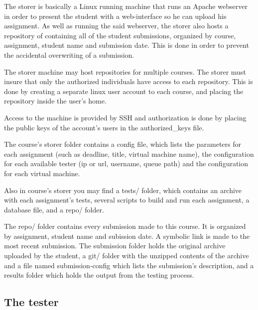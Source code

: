 The storer is basically a Linux running machine that runs an Apache webserver
in order to present the student with a web-interface so he can upload his
assignment. As well as running the said webserver, the storer also hosts a 
repository of containing all of the student submissions, organized by course,
assignment, student name and submission date. This is done in order to prevent
the accidental overwriting of a submission.

\begin{center}
\end{center}

The storer machine may host repositories for multiple courses. The storer
must insure that only the authorized individuals have access to each repository.
This is done by creating a separate linux user account to each course, and placing
the repository inside the user's home. 

Access to the machine is provided by SSH and authorization is done by placing
the public keys of the account's users in the authorized_keys file.

The course's storer folder contains a config file, which lists the parameters
for each assignment (such as deadline, title, virtual machine name), the 
configuration for each available tester (ip or url, username, queue path)
and the configuration for each virtual machine.

Also in course's storer you may find a tests/ folder, which contains an archive
with each assignment's tests, several scripts to build and run each assignment,
a database file, and a repo/ folder.

\begin{center}
\end{center}

The repo/ folder contains every submission made to this course. It is organized
by assignment, student name and subission date. A symbolic link is made to the 
most recent submission. The submission folder holds the original archive uploaded
by the student,  a git/ folder with the unzipped contents of the archive and a 
file named submission-config which lists the submission's description, and a
results folder which holds the output from the testing process.

\subsection{The tester}
\label{sub-sec:tester}

